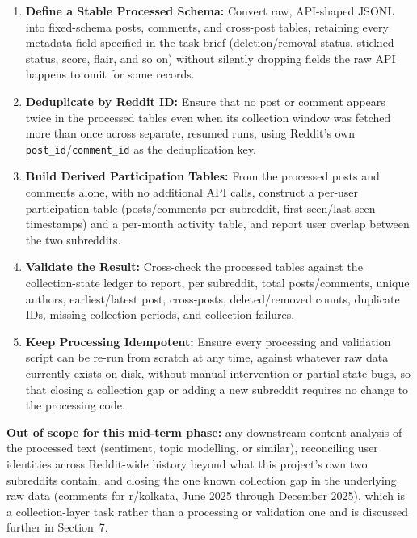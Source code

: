 \documentclass[12pt]{article}
\begin{document}
\begin{enumerate}
    \item \textbf{Define a Stable Processed Schema:} Convert raw, API-shaped JSONL into fixed-schema
    posts, comments, and cross-post tables, retaining every metadata field specified in the task
    brief (deletion/removal status, stickied status, score, flair, and so on) without silently
    dropping fields the raw API happens to omit for some records.

    \item \textbf{Deduplicate by Reddit ID:} Ensure that no post or comment appears twice in the
    processed tables even when its collection window was fetched more than once across separate,
    resumed runs, using Reddit's own \texttt{post\_id}/\texttt{comment\_id} as the deduplication
    key.

    \item \textbf{Build Derived Participation Tables:} From the processed posts and comments alone,
    with no additional API calls, construct a per-user participation table (posts/comments per
    subreddit, first-seen/last-seen timestamps) and a per-month activity table, and report user
    overlap between the two subreddits.

    \item \textbf{Validate the Result:} Cross-check the processed tables against the
    collection-state ledger to report, per subreddit, total posts/comments, unique authors,
    earliest/latest post, cross-posts, deleted/removed counts, duplicate IDs, missing collection
    periods, and collection failures.

    \item \textbf{Keep Processing Idempotent:} Ensure every processing and validation script can be
    re-run from scratch at any time, against whatever raw data currently exists on disk, without
    manual intervention or partial-state bugs, so that closing a collection gap or adding a new
    subreddit requires no change to the processing code.
\end{enumerate}

\textbf{Out of scope for this mid-term phase:} any downstream content analysis of the processed
text (sentiment, topic modelling, or similar), reconciling user identities across Reddit-wide
history beyond what this project's own two subreddits contain, and closing the one known
collection gap in the underlying raw data (comments for r/kolkata, June 2025 through December
2025), which is a collection-layer task rather than a processing or validation one and is
discussed further in Section~7.
\end{document}
